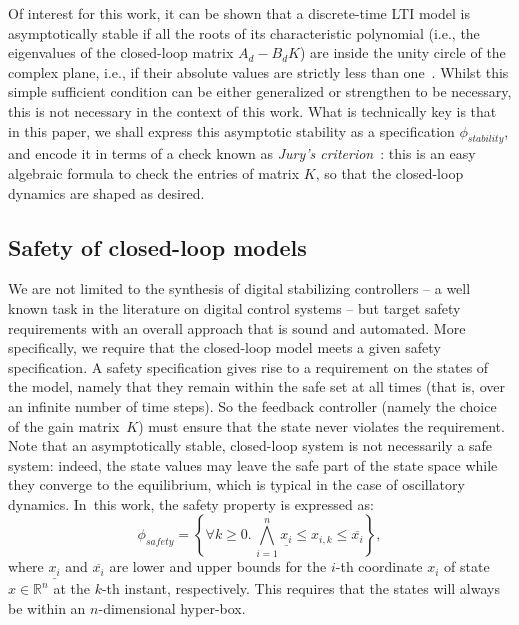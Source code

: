 Of interest for this work, 
it can be shown that a discrete-time LTI model %
is asymptotically stable if all the roots of its characteristic polynomial (i.e., the
eigenvalues of the closed-loop matrix $A_d - B_d K$) are inside the unity
circle of the complex plane, i.e., if their absolute values are strictly less than
one~\cite{astrom1997computer}. 
Whilst this simple sufficient condition can be either generalized or strengthen to be necessary, 
this is not necessary in the context of this work.    
What is technically key is that in this paper, 
we shall express this asymptotic stability as a specification $\phi_\mathit{stability}$, 
and encode it in terms of a check known as \emph{Jury's criterion}~\cite{fadali}: 
this is an easy algebraic formula to check the entries of matrix $K$, 
so that the closed-loop dynamics are shaped as desired. 

\subsection{Safety of closed-loop models}
\label{sec:safety}

We are not limited to the synthesis of digital stabilizing controllers -- a
well known task in the literature on digital control systems -- but target
safety requirements with an overall approach that is sound and automated. 
More specifically, we require that the closed-loop model 
meets a given safety specification.  
A safety specification gives rise to a requirement on the states of the model, 
namely that they remain within the safe set at all times (that is, over an infinite number of time steps).  
So the feedback controller (namely the choice of the gain matrix~$K$)
must ensure that the state never violates the requirement.  Note that an asymptotically 
stable, closed-loop system is not necessarily a safe system: indeed, the 
state values may leave the safe part of the state space while they converge
to the equilibrium, which is typical in the case of oscillatory dynamics. 
In~this work, the safety property is expressed as: 
%
\begin{equation}
\label{eq:safetyliteral}
\phi_\mathit{safety} = \left\{ \forall k\ge 0.\, \bigwedge_{i=1}^{n}{\underline{x_{i}} \leq x_{i,k} \leq \overline{x_{i}}}\right\},
\end{equation}
%
%
where $\underline{x_{i}}$ and $\overline{x_{i}}$ are lower and upper bounds
for the $i$-th coordinate $x_{i}$ of state $x\in \mathbb R^n$ 
at the $k$-th instant, respectively.  This requires that the states will always be within an $n$-dimensional hyper-box.


